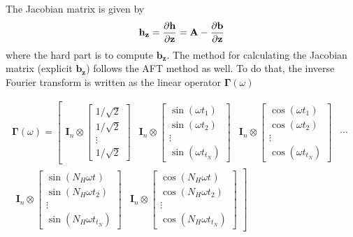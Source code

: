 The Jacobian matrix is given by
\begin{equation}
  \label{eq:hb_jac1}
    \bm h_{\bm z} = \frac{\p \bm h}{\p \bm z} = \bm A - \frac{\p \bm b}{\p \bm z}
\end{equation}
where the hard part is to compute $\bm b_{\bm z}$. The method for calculating
the Jacobian matrix (explicit $\bm b_{\bm z}$) follows the AFT method as well.
To do that, the inverse Fourier transform is written as the linear operator $\bm
\Gamma(\omega)$

\begin{equation}
  \label{eq:hb_gamma}
  \begin{aligned}
    \bm \Gamma(\omega) =
    \left[
  \begin{matrix}
    \bm{I}_n \otimes
    \begin{bmatrix}
      1/\sqrt{2} \\ 1/\sqrt{2} \\ \vdots \\ 1/\sqrt{2}
    \end{bmatrix} &
    \bm{I}_n \otimes
    \begin{bmatrix}
      \sin(\omega t_1) \\ \sin(\omega t_2) \\ \vdots \\ \sin(\omega t_{t_N})
    \end{bmatrix} &
    \bm{I}_n \otimes
    \begin{bmatrix}
      \cos(\omega t_1) \\ \cos(\omega t_2) \\ \vdots \\ \cos(\omega t_{t_N})
    \end{bmatrix}&
        \cdots
  \end{matrix}
\right. \\
\left.
  \begin{matrix}
    \bm{I}_n \otimes
    \begin{bmatrix}
      \sin(N_H\omega t_{}) \\ \sin(N_H\omega t_2) \\ \vdots \\ \sin(N_H\omega t_{t_N})
    \end{bmatrix} &
    \bm{I}_n \otimes
    \begin{bmatrix}
      \cos(N_H\omega t_{}) \\ \cos(N_H\omega t_2) \\ \vdots \\ \cos(N_H\omega t_{t_N})
    \end{bmatrix}
  \end{matrix}
\right]
\end{aligned}
\end{equation}

